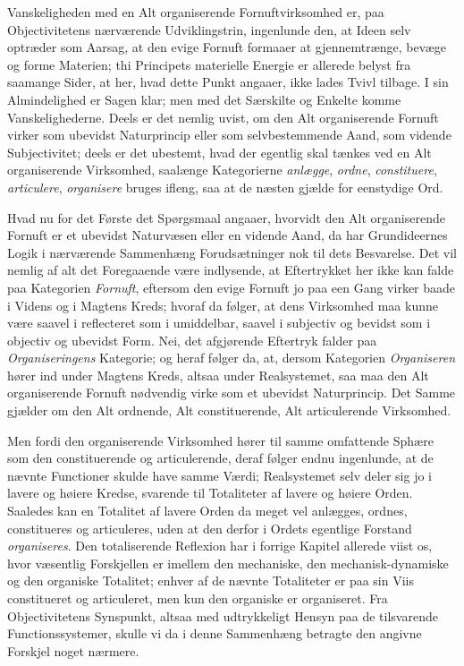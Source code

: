 \documentclass[12pt]{book}
\newcommand{\opage}[1]{\marginnote{\footnotesize\textit{[#1]}}}
\begin{document}
Vanskeligheden med en Alt organiserende Fornuftvirksomhed er, paa Objectivitetens nærværende
Udviklingstrin, ingenlunde den, at Ideen selv optræder som Aarsag, at den evige Fornuft formaaer
at gjennemtrænge, bevæge og forme Materien; thi Principets materielle Energie er allerede belyst
fra saamange Sider, at her, hvad dette Punkt angaaer, ikke lades Tvivl tilbage. I sin
Almindelighed er Sagen klar; men med det Særskilte og Enkelte komme Vanskelighederne. Deels er
det nemlig uvist, om den Alt organiserende Fornuft virker som ubevidst Naturprincip eller som
selvbestemmende Aand, som vidende Subjectivitet; deels er det ubestemt, hvad der egentlig skal
tænkes ved en Alt organiserende Virksomhed, saalænge Kategorierne \emph{anlægge}, \emph{ordne},
\emph{constituere}, \emph{articulere}, \emph{organisere} bruges ifleng, saa at de næsten gjælde
for eenstydige Ord.

Hvad nu for det Første det Spørgsmaal angaaer, hvorvidt den Alt organiserende Fornuft er et
ubevidst Naturvæsen eller en vidende Aand, da har Grundideernes Logik i nærværende Sammenhæng
Forudsætninger nok til dets Besvarelse. Det vil nemlig af alt det Foregaaende være indlysende, at
Eftertrykket her ikke kan falde paa Kategorien \emph{Fornuft},
\opage{396} eftersom den evige Fornuft jo paa een Gang virker baade i Videns og i Magtens Kreds; hvoraf da
følger, at dens Virksomhed maa kunne være saavel i reflecteret som i umiddelbar, saavel i
subjectiv og bevidst som i objectiv og ubevidst Form. Nei, det afgjørende Eftertryk falder paa
\emph{Organiseringens} Kategorie; og heraf følger da, at, dersom Kategorien \emph{Organiseren}
hører ind under Magtens Kreds, altsaa under Realsystemet, saa maa den Alt organiserende Fornuft
nødvendig virke som et ubevidst Naturprincip. Det Samme gjælder om den Alt ordnende, Alt
constituerende, Alt articulerende Virksomhed.

Men fordi den organiserende Virksomhed hører til samme omfattende Sphære som den constituerende
og articulerende, deraf følger endnu ingenlunde, at de nævnte Functioner skulde have samme
Værdi; Realsystemet selv deler sig jo i lavere og høiere Kredse, svarende til Totaliteter af
lavere og høiere Orden. Saaledes kan en Totalitet af lavere Orden da meget vel anlægges, ordnes,
constitueres og articuleres, uden at den derfor i Ordets egentlige Forstand \emph{organiseres}.
Den totaliserende Reflexion har i forrige Kapitel allerede viist os, hvor væsentlig Forskjellen
er imellem den mechaniske, den mechanisk-dynamiske og den organiske Totalitet; enhver af de
nævnte Totaliteter er paa sin Viis constitueret og articuleret, men kun den organiske er
organiseret. Fra Objectivitetens Synspunkt, altsaa med udtrykkeligt Hensyn paa de tilsvarende
Functionssystemer, skulle vi da i denne Sammenhæng betragte den angivne Forskjel noget nærmere.
\end{document}

